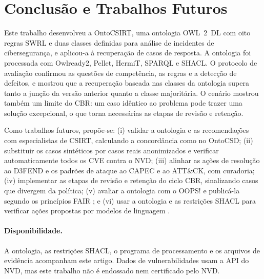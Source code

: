 \documentclass[12pt]{article}
\begin{document}
\section{Conclusão e Trabalhos Futuros}
\label{sec:conc}

Este trabalho desenvolveu a OntoCSIRT, uma ontologia OWL~2~DL com oito regras SWRL e duas classes definidas para análise de incidentes de cibersegurança, e aplicou-a à recuperação de casos de resposta. A ontologia foi processada com Owlready2, Pellet, HermiT, SPARQL e SHACL. O protocolo de avaliação confirmou as questões de competência, as regras e a detecção de defeitos, e mostrou que a recuperação baseada nas classes da ontologia supera tanto a junção da versão anterior quanto a classe majoritária. O cenário mostrou também um limite do CBR: um caso idêntico ao problema pode trazer uma solução excepcional, o que torna necessárias as etapas de revisão e retenção.

Como trabalhos futuros, propõe-se: (i) validar a ontologia e as recomendações com especialistas de CSIRT, calculando a concordância como no OntoCSD; (ii) substituir os casos sintéticos por casos reais anonimizados e verificar automaticamente todos os CVE contra o NVD; (iii) alinhar as ações de resolução ao D3FEND e os padrões de ataque ao CAPEC e ao ATT\&CK, com curadoria; (iv) implementar as etapas de revisão e retenção do ciclo CBR, sinalizando casos que divergem da política; (v) avaliar a ontologia com o OOPS! \cite{poveda2014oops} e publicá-la segundo os princípios FAIR \cite{oliveira2021fair}; e (vi) usar a ontologia e as restrições SHACL para verificar ações propostas por modelos de linguagem \cite{hammar2026,cotti2026ontologx}.

\paragraph{Disponibilidade.} A ontologia, as restrições SHACL, o programa de processamento e os arquivos de evidência acompanham este artigo. Dados de vulnerabilidades usam a API do NVD, mas este trabalho não é endossado nem certificado pelo NVD.



\end{document}
